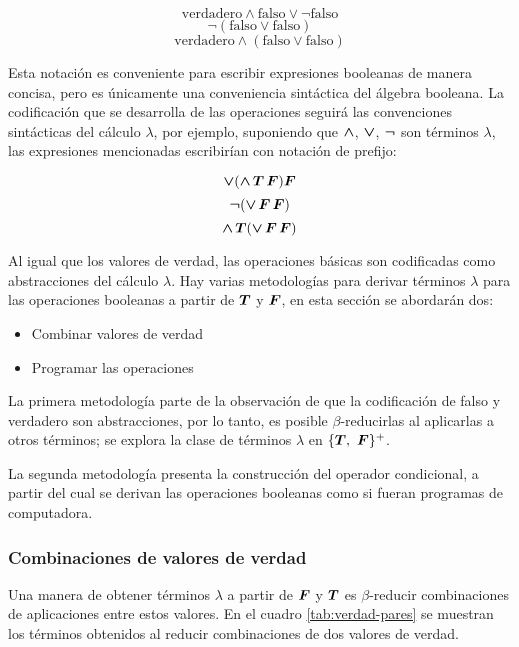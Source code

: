 \[ \mathrm{verdadero} \land \mathrm{falso} \lor \lnot \mathrm{falso} \]
\[ \lnot (\mathrm{falso} \lor \mathrm{falso}) \]
\[ \mathrm{verdadero} \land (\mathrm{falso} \lor \mathrm{falso}) \]

Esta notación es conveniente para escribir expresiones booleanas de manera concisa, pero es únicamente una conveniencia sintáctica del álgebra booleana. La codificación que se desarrolla de las operaciones seguirá las convenciones sintácticas del cálculo \( λ \), por ejemplo, suponiendo que \( \boldsymbol{\land} \), \( \boldsymbol{\lor} \), \( \boldsymbol{\lnot} \) son términos \( λ \), las expresiones mencionadas escribirían con notación de prefijo:

\[ \boldsymbol{\lor} (\boldsymbol{\land}\, \boldsymbol{T}\, \boldsymbol{F}) \boldsymbol{F} \]
\[ \boldsymbol{\lnot} (\boldsymbol{\lor}\, \boldsymbol{F}\, \boldsymbol{F}) \]
\[ \boldsymbol{\land}\, \boldsymbol{T} (\boldsymbol{\lor}\, \boldsymbol{F}\, \boldsymbol{F}) \]

Al igual que los valores de verdad, las operaciones básicas son codificadas como abstracciones del cálculo \( λ \). Hay varias metodologías para derivar términos \( λ \) para las operaciones booleanas a partir de \( \boldsymbol{T} \) y \( \boldsymbol{F} \), en esta sección se abordarán dos:
\begin{itemize}
\item Combinar valores de verdad
\item Programar las operaciones
\end{itemize}
La primera metodología parte de la observación de que la codificación de falso y verdadero son abstracciones, por lo tanto, es posible \( β \)-reducirlas al aplicarlas a otros términos; se explora la clase de términos \( λ \) en \( \{ \boldsymbol{T},\ \boldsymbol{F} \}^{+} \).

La segunda metodología presenta la construcción del operador condicional, a partir del cual se derivan las operaciones booleanas como si fueran programas de computadora.

\subsubsection{Combinaciones de valores de verdad}
\label{sec:combinacion-valores}

Una manera de obtener términos \( λ \) a partir de \( \boldsymbol{F} \) y \( \boldsymbol{T} \) es \( β \)-reducir combinaciones de aplicaciones entre estos valores. En el cuadro \ref{tab:verdad-pares} se muestran los términos obtenidos al reducir combinaciones de dos valores de verdad.

